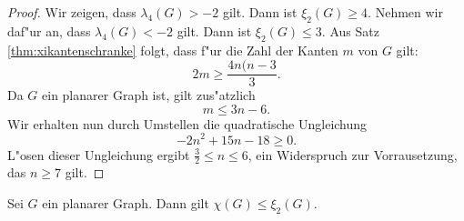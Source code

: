 \begin{proof}
  Wir zeigen, dass $\lambda_4(G) > -2$ gilt. Dann ist $\xi_{2}(G) \geq 4$. 
  Nehmen wir daf"ur an, dass $\lambda_{4}(G) < -2$ gilt.
  Dann ist $\xi_{2}(G)\leq 3$. Aus Satz \ref{thm:xikantenschranke} folgt, dass f"ur die Zahl der Kanten $m$ von $G$ gilt:
  $$2m \geq \frac{4n(n-3}{3}.$$
  Da $G$ ein planarer Graph ist, gilt zus"atzlich $$ m \leq 3n-6.$$
  Wir erhalten nun durch Umstellen die quadratische Ungleichung $$-2n^{2} +15n -18 \geq 0.$$
  L"osen dieser Ungleichung ergibt $ \frac{3}{2} \leq n \leq 6$, ein Widerspruch zur Vorrausetzung, das $n \geq 7$ gilt.
\end{proof} 

\begin{corollary}
  Sei $G$ ein planarer Graph. Dann gilt $\chi(G) \leq \xi_{2}(G) $. 
\end{corollary}
